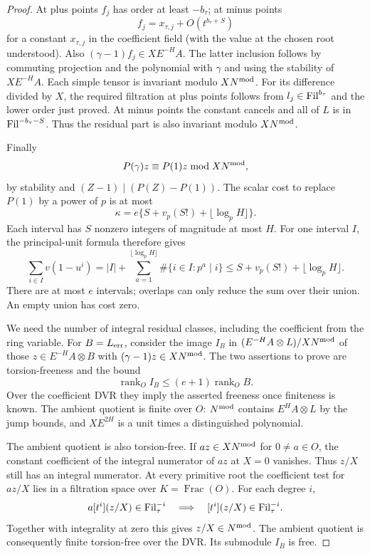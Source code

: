 \begin{proof}
At plus points \(f_j\) has order at least \(-b_\tau\); at minus
points
\[
 f_j=x_{\tau,j}+O(t^{b_\tau+S})
\]
for a constant
\(x_{\tau,j}\) in the coefficient field (with the value at the
chosen root understood). Also \((\gamma-1)f_j\in X E^{-H}A\).
The latter inclusion follows by commuting projection and the polynomial
with \(\gamma\) and using the stability of \(XE^{-H}A\).
Each simple tensor is invariant modulo \(XN^{\rm mod}\).
For its difference divided by \(X\), the required filtration at
plus points follows from \(l_j\in{\rm Fil}^{b_\tau}\) and the lower
order just proved. At minus points the constant cancels and all
of \(L\) is in \({\rm Fil}^{-b_\tau-S}\).
Thus the residual part is also invariant modulo \(XN^{\rm mod}\).

Finally
\[
 P(\gamma)z\equiv P(1)z\bmod XN^{\rm mod},
\]
by stability
and \((Z-1)\mid(P(Z)-P(1))\).
The scalar cost to replace \(P(1)\) by a power of \(p\) is at most
\[
             \kappa=e\{S+v_p(S!)+\lfloor\log_p H\rfloor\}.
\]
Each interval has \(S\) nonzero integers of magnitude at most \(H\).
For one interval \(I\), the principal-unit formula therefore gives
\[
 \sum_{i\in I}v(1-u^i)
 = |I|+\sum_{a=1}^{\lfloor\log_p H\rfloor}
                  \#\{i\in I:p^a\mid i\}
 \le S+v_p(S!)+\lfloor\log_p H\rfloor .
\]
There are at most \(e\) intervals; overlaps can only reduce
the sum over their union. An empty union has cost zero.

We need the number of integral residual classes, including the
coefficient from the ring variable. For \(B=L_{\rm err}\), consider
the image \(I_B\) in \((E^{-H}A\otimes L)/XN^{\rm mod}\) of those
\(z\in E^{-H}A\otimes B\) with \((\gamma-1)z\in XN^{\rm mod}\).
The two assertions to prove are torsion-freeness and the bound
\[
 \operatorname{rank}_O I_B\le(e+1)\operatorname{rank}_O B.
\]
Over the coefficient DVR they imply the asserted freeness once finiteness is known.
The ambient quotient is finite over \(O\): \(N^{\rm mod}\) contains
\(E^HA\otimes L\) by the jump bounds, and \(XE^{2H}\) is a unit times
a distinguished polynomial.

The ambient quotient is also torsion-free. If \(a z\in
XN^{\rm mod}\) for \(0\ne a\in O\), the constant coefficient of the
integral numerator of \(a z\) at \(X=0\) vanishes. Thus \(z/X\) still
has an integral numerator. At every primitive root the coefficient test for \(az/X\) lies in a
filtration space over \(K=\operatorname{Frac}(O)\). For each degree \(i\),
\[
  a[t^i](z/X)\in {\rm Fil}^{-i}_\tau
      \quad\Longrightarrow\quad [t^i](z/X)\in {\rm Fil}^{-i}_\tau .
\]
Together with integrality at zero this gives \(z/X\in N^{\rm mod}\).
The ambient quotient is consequently finite torsion-free over the DVR.
Its submodule \(I_B\) is free.


\end{proof}
